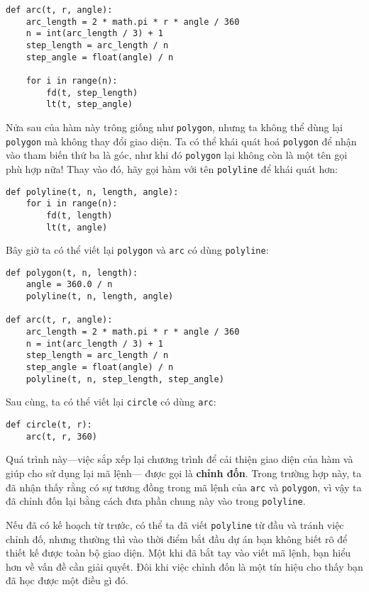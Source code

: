 \documentclass[11pt]{book}
\begin{document}
\beforeverb
\begin{verbatim}
def arc(t, r, angle):
    arc_length = 2 * math.pi * r * angle / 360
    n = int(arc_length / 3) + 1
    step_length = arc_length / n
    step_angle = float(angle) / n
    
    for i in range(n):
        fd(t, step_length)
        lt(t, step_angle)
\end{verbatim}
\afterverb
%
Nửa sau của hàm này trông giống như {\tt polygon}, nhưng ta 
không thể dùng lại {\tt polygon} mà không thay đổi giao diện. 
Ta có thể khái quát hoá {\tt polygon} để nhận vào tham biến
thứ ba là góc, như khi đó {\tt polygon} lại không còn là một tên
gọi phù hợp nữa! Thay vào đó, hãy gọi hàm với tên {\tt polyline}
để khái quát hơn:

\beforeverb
\begin{verbatim}
def polyline(t, n, length, angle):
    for i in range(n):
        fd(t, length)
        lt(t, angle)
\end{verbatim}
\afterverb
%
Bây giờ ta có thể viết lại {\tt polygon} và {\tt arc} có dùng {\tt polyline}:

\beforeverb
\begin{verbatim}
def polygon(t, n, length):
    angle = 360.0 / n
    polyline(t, n, length, angle)

def arc(t, r, angle):
    arc_length = 2 * math.pi * r * angle / 360
    n = int(arc_length / 3) + 1
    step_length = arc_length / n
    step_angle = float(angle) / n
    polyline(t, n, step_length, step_angle)
\end{verbatim}
\afterverb
%
Sau cùng, ta có thể viết lại {\tt circle} có dùng {\tt arc}:

\beforeverb
\begin{verbatim}
def circle(t, r):
    arc(t, r, 360)
\end{verbatim}
\afterverb
%
Quá trình này---việc sắp xếp lại chương trình để cải
thiện giao diện của hàm và giúp cho sử dụng lại mã lệnh---
được gọi là  {\bf chỉnh đốn}. Trong trường hợp này, ta đã
nhận thấy rằng có sự tương đồng trong mã lệnh của {\tt arc} và 
{\tt polygon}, vì vậy ta đã chỉnh đốn lại bằng cách đưa
phần chung này vào trong {\tt polyline}.


Nếu đã có kế hoạch từ trước, có thể ta đã viết {\tt polyline} từ đầu 
và tránh việc chỉnh đố, nhưng thường thì vào thời điểm bắt đầu 
dự án bạn không biết rõ để thiết kế được toàn bộ giao diện. Một khi
đã bắt tay vào viết mã lệnh, bạn hiểu hơn về vấn đề cần giải quyết.
Đôi khi việc chỉnh đốn là một tín hiệu cho thấy bạn đã học được
một điều gì đó.
\end{document}
